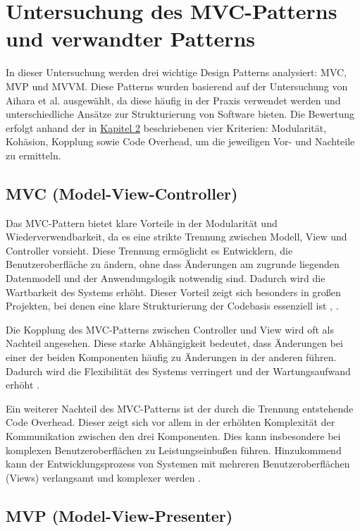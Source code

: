 \chapter{Untersuchung des MVC-Patterns und verwandter Patterns}

In dieser Untersuchung werden drei wichtige Design Patterns analysiert: \ac{MVC}, \ac{MVP} und \ac{MVVM}. Diese Patterns wurden basierend auf der Untersuchung von Aihara et al. \cite{aihara2012mvc} ausgewählt, da diese häufig in der Praxis verwendet werden und unterschiedliche Ansätze zur Strukturierung von Software bieten. Die Bewertung erfolgt anhand der in \hyperref[chap:methodik]{Kapitel 2} beschriebenen vier Kriterien: Modularität, Kohäsion, Kopplung sowie Code Overhead, um die jeweiligen Vor- und Nachteile zu ermitteln.

\section{MVC (Model-View-Controller)}

Das \ac{MVC}-Pattern bietet klare Vorteile in der Modularität und Wiederverwendbarkeit, da es eine strikte Trennung zwischen 
Modell, View und Controller vorsieht. Diese Trennung ermöglicht 
es Entwicklern, die Benutzeroberfläche zu ändern, ohne dass 
Änderungen am zugrunde liegenden Datenmodell und der Anwendungslogik notwendig sind. Dadurch wird die Wartbarkeit des Systems erhöht. Dieser Vorteil zeigt sich besonders in großen Projekten, bei denen eine klare Strukturierung der Codebasis essenziell ist \cite{eudl63}, 
\cite{researchgate65}.

Die Kopplung des \ac{MVC}-Patterns zwischen Controller und View wird oft als Nachteil angesehen. Diese starke Abhängigkeit bedeutet, dass Änderungen bei einer der beiden Komponenten häufig zu Änderungen in der anderen führen. Dadurch wird die Flexibilität des Systems verringert und der Wartungsaufwand erhöht \cite{researchgate65}.

Ein weiterer Nachteil des \ac{MVC}-Patterns ist der durch die Trennung entstehende Code Overhead. Dieser zeigt sich vor allem in der erhöhten Komplexität der Kommunikation zwischen den drei 
Komponenten. Dies kann insbesondere bei komplexen Benutzeroberflächen zu Leistungseinbußen führen. Hinzukommend kann der Entwicklungsprozess von Systemen mit mehreren Benutzeroberflächen (Views) verlangsamt und komplexer werden \cite{eudl63}.

\section{MVP (Model-View-Presenter)}


